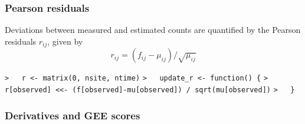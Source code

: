\documentclass[a4paper]{article}
\begin{document}
\subsubsection{Pearson residuals\label{r}}\par

Deviations between measured and estimated counts are quantified by the
Pearson residuals $r_{ij}$, given by
\begin{equation}
  r_{ij} = (f_{ij} - \mu_{ij}) / \sqrt{\mu_{ij}}
\end{equation}\par
\verb~>   r <- matrix(0, nsite, ntime)~\newline
\verb~>   update_r <- function() {~\newline
\verb~>     r[observed] <<- (f[observed]-mu[observed]) / sqrt(mu[observed])~\newline
\verb~>   }~\par



\subsubsection{Derivatives and GEE scores}\par
\end{document}
